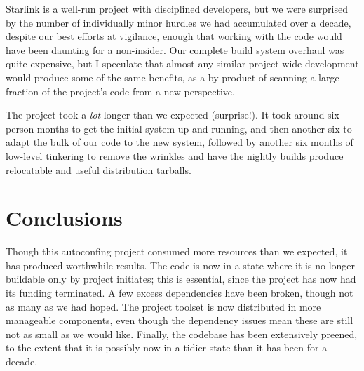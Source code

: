 \documentclass{speauth}
\begin{document}
Starlink is a well-run project with disciplined developers, but we
were surprised by the number of individually minor hurdles we had
accumulated over a decade, despite our best efforts at vigilance,
enough that working with
the code would have been daunting for a non-insider.  Our complete
build system overhaul was quite expensive, but I speculate that almost
any similar project-wide development would produce some of the same
benefits, as a by-product of scanning a large fraction of the
project's code from a new perspective.

The project took a \emph{lot} longer than we expected (surprise!).  It
took around six person-months to get the initial system up and
running, and then another six to adapt the bulk of our code to the new
system, followed by another six months of low-level tinkering to
remove the wrinkles and have the nightly builds produce relocatable
and useful distribution tarballs.

\section{Conclusions}

Though this autoconfing project consumed more resources than we
expected, it has produced worthwhile results.  The code is now in a
state where it is no longer buildable only by project initiates; this
is essential, since the project has now had its funding terminated.  A
few excess dependencies have been broken, though not as many as we had hoped.
The project toolset is now distributed in more manageable components,
even though the dependency issues mean these are still not as small as
we would like.  Finally, the codebase has been extensively preened, to the
extent that it is possibly now in a tidier state than it has been for
a decade.











\end{document}
